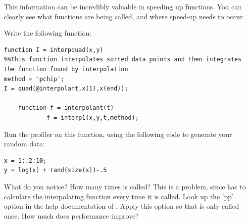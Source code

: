 This information can be incredibly valuable in speeding up functions. You can clearly see what functions are being called, and where speed-up needs to occur.

\begin{problem}
Write the following function:
\begin{lstlisting}[style=matlab]
function I = interpquad(x,y)
%%This function interpolates sorted data points and then integrates the function found by interpolation
method = 'pchip';
I = quad(@interpolant,x(1),x(end));

    function f = interpolant(t)
            f = interp1(x,y,t,method); 
\end{lstlisting}

Run the profiler on this function, using the following code to generate your random data:

\begin{lstlisting}[style=matlab]
x = 1:.2:10;
y = log(x) + rand(size(x))-.5
\end{lstlisting}

What do you notice? How many times is  called? This is a problem, since  has to calculate the interpolating function every time it is called. Look up the 'pp' option in the help documentation of . Apply this option so that  is only called once. How much does performance improve?
\end{problem}


